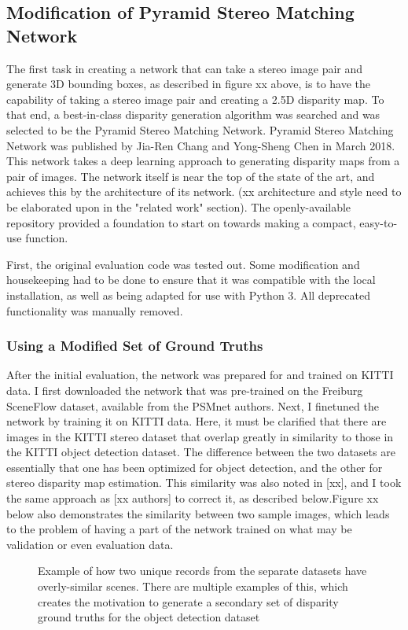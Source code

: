 \subsection{Modification of Pyramid Stereo Matching Network}
The first task in creating a network that can take a stereo image pair and generate 3D bounding boxes, as described in figure xx above, is to have the capability of taking a stereo image pair and creating a 2.5D disparity map. To that end, a best-in-class disparity generation algorithm was searched and was selected to be the Pyramid Stereo Matching Network. Pyramid Stereo Matching Network was published by Jia-Ren Chang and Yong-Sheng Chen in March 2018. This network takes a deep learning approach to generating disparity maps from a pair of images. The network itself is near the top of the state of the art, and achieves this by the architecture of its network. (xx architecture and style need to be elaborated upon in the "related work" section). The openly-available repository provided a foundation to start on towards making a compact, easy-to-use function.

First, the original evaluation code was tested out. Some modification and housekeeping had to be done to ensure that it was compatible with the local installation, as well as being adapted for use with Python 3. All deprecated functionality was manually removed.

\subsubsection{Using a Modified Set of Ground Truths}
After the initial evaluation, the network was prepared for and trained on KITTI data. I first downloaded the network that was pre-trained on the Freiburg SceneFlow dataset, available from the PSMnet authors. Next, I finetuned the network by training it on KITTI data. Here, it must be clarified that there are images in the KITTI stereo dataset that overlap greatly in similarity to those in the KITTI object detection dataset. The difference between the two datasets are essentially that one has been optimized for object detection, and the other for stereo disparity map estimation. This similarity was also noted in [xx], and I took the same approach as [xx authors] to correct it, as described below.Figure xx below also demonstrates the similarity between two sample images, which leads to the problem of having a part of the network trained on what may be validation or even evaluation data.

\begin{figure}[H]
    \centering
    \caption{Example of how two unique records from the separate datasets have overly-similar scenes. There are multiple examples of this, which creates the motivation to generate a secondary set of disparity ground truths for the object detection dataset}
    \label{similarity_stereo_objdet}
\end{figure}

